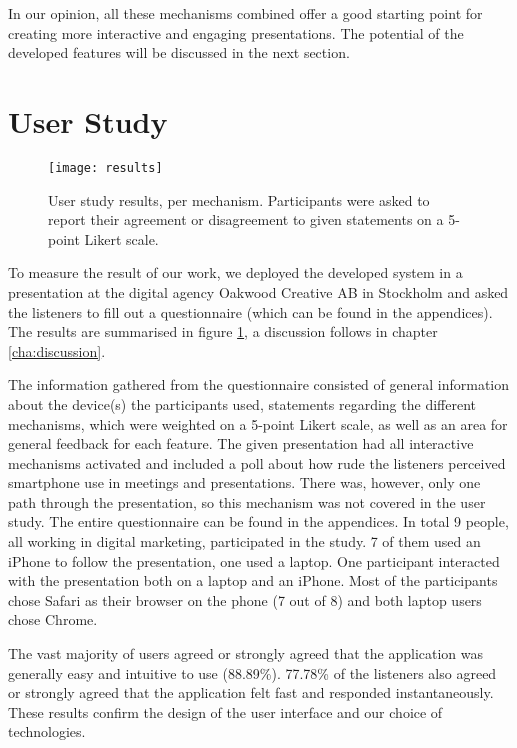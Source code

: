 In our opinion, all these mechanisms combined offer a good starting point for creating more interactive and engaging presentations. The potential of the developed features will be discussed in the next section.

\section{User Study}
\label{sec:results-study}

\begin{figure}
\centering
\texttt{[image: results]}
\caption{User study results, per mechanism. Participants were asked to report their agreement or disagreement to given statements on a 5-point Likert scale.}
\label{fig:results-study-results}
\end{figure}

To measure the result of our work, we deployed the developed system in a presentation at the digital agency Oakwood Creative AB in Stockholm and asked the listeners to fill out a questionnaire (which can be found in the appendices). The results are summarised in figure \ref{fig:results-study-results}, a discussion follows in chapter \ref{cha:discussion}.

The information gathered from the questionnaire consisted of general information about the device(s) the participants used, statements regarding the different mechanisms, which were weighted on a 5-point Likert scale, as well as an area for general feedback for each feature. The given presentation had all interactive mechanisms activated and included a poll about how rude the listeners perceived smartphone use in meetings and presentations. There was, however, only one path through the presentation, so this mechanism was not covered in the user study. The entire questionnaire can be found in the appendices.
In total 9 people, all working in digital marketing, participated in the study. 7 of them used an iPhone to follow the presentation, one used a laptop. One participant interacted with the presentation both on a laptop and an iPhone. Most of the participants chose Safari as their browser on the phone (7 out of 8) and both laptop users chose Chrome.

The vast majority of users agreed or strongly agreed that the application was generally easy and intuitive to use (88.89\%). 77.78\% of the listeners also agreed or strongly agreed that the application felt fast and responded instantaneously. These results confirm the design of the user interface and our choice of technologies.

